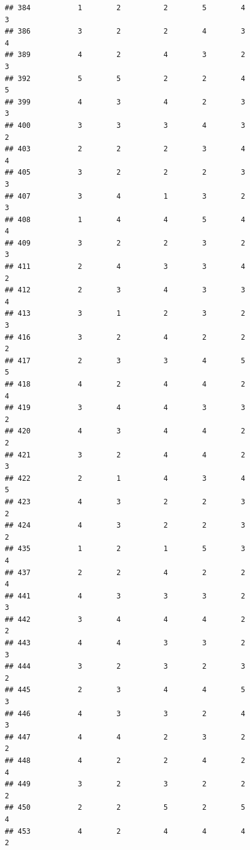 \documentclass[
]{article}
\begin{document}
\begin{verbatim}
## 384           1        2          2        5        4               3
## 386           3        2          2        4        3               4
## 389           4        2          4        3        2               3
## 392           5        5          2        2        4               5
## 399           4        3          4        2        3               3
## 400           3        3          3        4        3               2
## 403           2        2          2        3        4               4
## 405           3        2          2        2        3               3
## 407           3        4          1        3        2               3
## 408           1        4          4        5        4               4
## 409           3        2          2        3        2               3
## 411           2        4          3        3        4               2
## 412           2        3          4        3        3               4
## 413           3        1          2        3        2               3
## 416           3        2          4        2        2               2
## 417           2        3          3        4        5               5
## 418           4        2          4        4        2               4
## 419           3        4          4        3        3               2
## 420           4        3          4        4        2               2
## 421           3        2          4        4        2               3
## 422           2        1          4        3        4               5
## 423           4        3          2        2        3               2
## 424           4        3          2        2        3               2
## 435           1        2          1        5        3               4
## 437           2        2          4        2        2               4
## 441           4        3          3        3        2               3
## 442           3        4          4        4        2               2
## 443           4        4          3        3        2               3
## 444           3        2          3        2        3               2
## 445           2        3          4        4        5               3
## 446           4        3          3        2        4               3
## 447           4        4          2        3        2               2
## 448           4        2          2        4        2               4
## 449           3        2          3        2        2               2
## 450           2        2          5        2        5               4
## 453           4        2          4        4        4               2

\end{verbatim}
\end{document}
